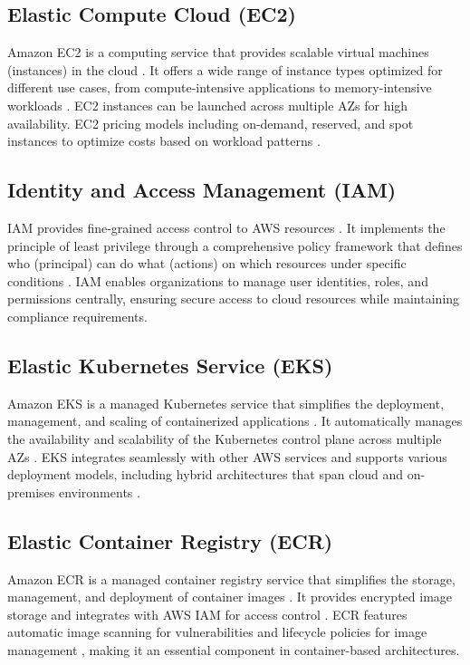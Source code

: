 \subsection{Elastic Compute Cloud (EC2)}
Amazon EC2 is a computing service that provides scalable virtual machines (instances) in the cloud \cite{ec2_definition}. It offers a wide range of instance types optimized for different use cases, from compute-intensive applications to memory-intensive workloads \cite{ec2_instance_types}. EC2 instances can be launched across multiple AZs for high availability. EC2 pricing models including on-demand, reserved, and spot instances to optimize costs based on workload patterns \cite{ec2_pricing}.

\subsection{Identity and Access Management (IAM)}
IAM provides fine-grained access control to AWS resources \cite{iam_definition}. It implements the principle of least privilege through a comprehensive policy framework that defines who (principal) can do what (actions) on which resources under specific conditions \cite{iam_security}. IAM enables organizations to manage user identities, roles, and permissions centrally, ensuring secure access to cloud resources while maintaining compliance requirements.

\subsection{Elastic Kubernetes Service (EKS)}
Amazon EKS is a managed Kubernetes service that simplifies the deployment, management, and scaling of containerized applications \cite{eks_definition}. It automatically manages the availability and scalability of the Kubernetes control plane across multiple AZs \cite{eks_definition}. EKS integrates seamlessly with other AWS services and supports various deployment models, including hybrid architectures that span cloud and on-premises environments \cite{eks_deployment}.

\subsection{Elastic Container Registry (ECR)}
Amazon ECR is a managed container registry service that simplifies the storage, management, and deployment of container images \cite{ecr_definition}. It provides encrypted image storage and integrates with AWS IAM for access control \cite{ecr_iam}. ECR features automatic image scanning for vulnerabilities \cite{ecr_image_scanning} and lifecycle policies for image management \cite{ecr_lifecycle}, making it an essential component in container-based architectures.

